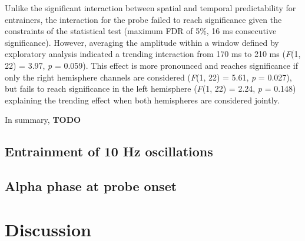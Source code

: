 \documentclass[dwyatte_dissertation.tex]{subfiles}
\begin{document}
Unlike the significant interaction between spatial and temporal predictability for entrainers, the interaction for the probe failed to reach significance given the constraints of the statistical test (maximum FDR of 5\%, 16 ms consecutive significance). However, averaging the amplitude within a window defined by exploratory analysis indicated a trending interaction from 170 ms to 210 ms (\textit{F}(1, 22) = 3.97, \textit{p} = 0.059). This effect is more pronounced and reaches significance if only the right hemisphere channels are considered (\textit{F}(1, 22) = 5.61, \textit{p} = 0.027), but fails to reach significance in the left hemisphere (\textit{F}(1, 22) = 2.24, \textit{p} = 0.148) explaining the trending effect when both hemispheres are considered jointly.

In summary, \textbf{TODO}

\subsection{Entrainment of 10 Hz oscillations}


\subsection{Alpha phase at probe onset}

\section{Discussion}



\end{document}
